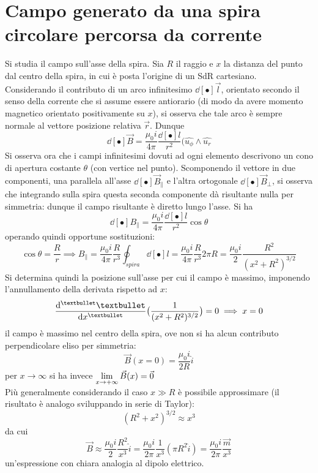 
\section{Campo generato da una spira circolare percorsa da corrente}
Si studia il campo sull'asse della spira. Sia $R$ il raggio e $x$ la distanza del punto dal centro della spira, in cui è posta l'origine di un SdR cartesiano.
\\Considerando il contributo di un arco infinitesimo $\dd[•]{\vec{l}}$, orientato secondo il senso della corrente che si assume essere antiorario (di modo da avere momento magnetico orientato positivamente su $x$), si osserva che tale arco è sempre normale al vettore posizione relativa $\vec{r}$. Dunque
\[\dd[•]{\vec{B}} = \frac{\mu_0 i}{4 \pi} \frac{\dd[•]{l}}{r^2} (\hat{u_\phi} \wedge \hat{u_r}\]
Si osserva ora che i campi infinitesimi dovuti ad ogni elemento descrivono un cono di apertura costante $\theta$ (con vertice nel punto). Scomponendo il vettore in due componenti, una parallela all'asse $\dd[•]{\vec{B}_\parallel}$ e l'altra ortogonale $\dd[•]{\vec{B}_\perp}$, si osserva che integrando sulla spira questa seconda componente dà risultante nulla per simmetria: dunque il campo risultante è diretto lungo l'asse. Si ha
\[\dd[•]{B_\parallel} = \frac{\mu_0 i}{4 \pi} \frac{\dd[•]{l}}{r^2} \cos \theta\]
operando quindi opportune sostituzioni:
\[\cos \theta = \frac{R}{r} \implies B_\parallel = \frac{\mu_0 i}{4 \pi} \frac{R}{r^3} \oint_{spira} \dd[•]{l} = \frac{\mu_0 i}{4 \pi} \frac{R}{r^3} 2 \pi R = \frac{\mu_0 i}{2} \frac{R^2}{(x^2 + R^2)^{3/2}}\]
Si determina quindi la posizione sull'asse per cui il campo è massimo, imponendo l'annullamento della derivata rispetto ad $x$:
\[\dv[•]{•}{x} \big(\frac{1}{(x^2 + R^2)^{3/2}}\big) = 0 \implies x = 0\]
il campo è massimo nel centro della spira, ove non si ha alcun contributo perpendicolare eliso per simmetria:
\[\vec{B}(x=0) = \frac{\mu_0 i}{2R} \hat{i}\]
per $x \rightarrow \infty$ si ha invece $\displaystyle \lim\limits_{x \rightarrow +\infty} \vec{B}(x) = \vec{0}$
\\Più generalmente considerando il caso $x \gg R$ è possibile approssimare (il risultato è analogo sviluppando in serie di Taylor):
\[(R^2 + x^2)^{3/2} \approx x^3\]
da cui
\[\vec{B} \approx \frac{\mu_0 i}{2} \frac{R^2}{x^3} \hat{i} = \frac{\mu_0 i}{2\pi} \frac{1}{x^3} (\pi R^2 \hat{i}) = \frac{\mu_0 i}{2\pi} \frac{\vec{m}}{x^3}\]
un'espressione con chiara analogia al dipolo elettrico.

